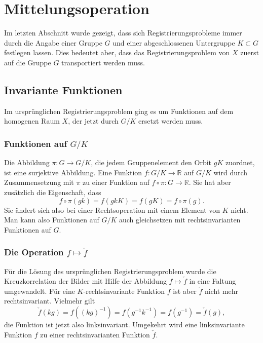 %
%
%
\section{Mittelungsoperation
\label{buch:nichtkomm:section:mittelung}}
Im letzten Abschnitt wurde gezeigt, dass sich Registrierungsprobleme
immer durch die Angabe einer Gruppe $G$ und einer abgeschlossenen
Untergruppe $K\subset G$ festlegen lassen.
Dies bedeutet aber, dass das Registrierungsproblem von $X$ zuerst
auf die Gruppe $G$ transportiert werden muss.

%
%
\subsection{Invariante Funktionen}
Im ursprünglichen Registrierungsproblem ging es um Funktionen auf
dem homogenen Raum $X$, der jetzt durch $G/K$ ersetzt werden muss.

%
%
\subsubsection{Funktionen auf $G/K$}
Die Abbildung $\pi\colon G\to G/K$, die jedem Gruppenelement den Orbit $gK$
zuordnet, ist eine surjektive Abbildung.
Eine Funktion $f\colon G/K\to\mathbb{R}$ auf $G/K$ wird durch Zusammensetzung
mit $\pi$ zu einer Funktion auf $f\circ\pi\colon G\to\mathbb{R}$.
Sie hat aber zusätzlich die Eigenschaft, dass
\[
f\circ\pi(gk) = f(gkK) = f(gK) = f\circ \pi (g).
\]
Sie ändert sich also bei einer Rechtsoperation mit einem Element
von $K$ nicht.
Man kann also Funktionen auf $G/K$ auch gleichsetzen mit rechtsinvarianten
Funktionen auf $G$.

%
%
\subsubsection{Die Operation $f\mapsto\check{f}$}
Für die Lösung des ursprünglichen Registrierungsproblem wurde die
Kreuzkorrelation der Bilder mit Hilfe der Abbildung $f\mapsto \check{f}$
in eine Faltung umgewandelt.
Für eine $K$-rechtsinvariante Funktion $f$ ist aber $\check{f}$ nicht
mehr rechtsinvariant.
Vielmehr gilt
\[
\check{f}(kg)
=
f((kg)^{-1})
=
f(g^{-1}k^{-1})
=
f(g^{-1})
=
\check{f}(g),
\]
die Funktion ist jetzt also linksinvariant.
Umgekehrt wird eine linksinvariante Funktion $f$ zu einer
rechtsinvarianten Funktion $\check{f}$.

